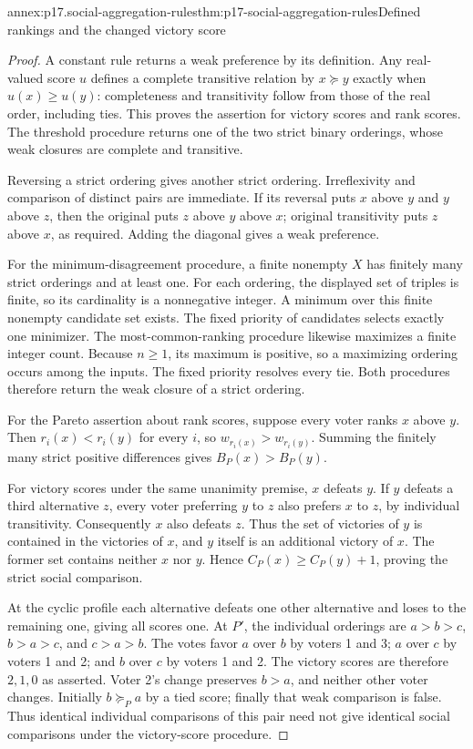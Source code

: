 \begin{annexitem}{annex:p17.social-aggregation-rules}{thm:p17-social-aggregation-rules}{Defined rankings and the changed victory score}
\begin{proof}
A constant rule returns a weak preference by its definition.
Any real-valued score \(u\) defines a complete transitive relation by
\(x\succeq y\) exactly when \(u(x)\geq u(y)\): completeness and
transitivity follow from those of the real order, including ties.
This proves the assertion for victory scores and rank scores.
The threshold procedure returns one of the two strict binary orderings,
whose weak closures are complete and transitive.

Reversing a strict ordering gives another strict ordering. Irreflexivity
and comparison of distinct pairs are immediate. If its reversal puts
\(x\) above \(y\) and \(y\) above \(z\), then the original puts
\(z\) above \(y\) above \(x\); original transitivity puts \(z\) above
\(x\), as required. Adding the diagonal gives a weak preference.

For the minimum-disagreement procedure, a finite nonempty \(X\) has
finitely many strict orderings and at least one. For each ordering,
the displayed set of triples is finite, so its cardinality is a
nonnegative integer. A minimum over this finite nonempty candidate set
exists. The fixed priority of candidates selects exactly one minimizer.
The most-common-ranking procedure likewise maximizes a finite integer
count. Because \(n\geq1\), its maximum is positive, so a maximizing
ordering occurs among the inputs. The fixed priority resolves every tie.
Both procedures therefore return the weak closure of a strict ordering.

For the Pareto assertion about rank scores, suppose every voter ranks
\(x\) above \(y\). Then \(r_i(x)<r_i(y)\) for every \(i\), so
\(w_{r_i(x)}>w_{r_i(y)}\). Summing the finitely many strict positive
differences gives \(B_P(x)>B_P(y)\).

For victory scores under the same unanimity premise, \(x\) defeats \(y\).
If \(y\) defeats a third alternative \(z\), every voter preferring \(y\)
to \(z\) also prefers \(x\) to \(z\), by individual transitivity.
Consequently \(x\) also defeats \(z\). Thus the set of victories of
\(y\) is contained in the victories of \(x\), and \(y\) itself is an
additional victory of \(x\). The former set contains neither \(x\) nor
\(y\). Hence \(C_P(x)\geq C_P(y)+1\), proving the strict social comparison.

At the cyclic profile each alternative defeats one other alternative and
loses to the remaining one, giving all scores one. At \(P'\), the
individual orderings are \(a>b>c\), \(b>a>c\), and \(c>a>b\).
The votes favor \(a\) over \(b\) by voters 1 and 3; \(a\) over \(c\)
by voters 1 and 2; and \(b\) over \(c\) by voters 1 and 2.
The victory scores are therefore \(2,1,0\) as asserted.
Voter 2's change preserves \(b>a\), and neither other voter changes.
Initially \(b\succeq_Pa\) by a tied score; finally that weak comparison
is false. Thus identical individual comparisons of this pair need not
give identical social comparisons under the victory-score procedure.
\end{proof}
\end{annexitem}

